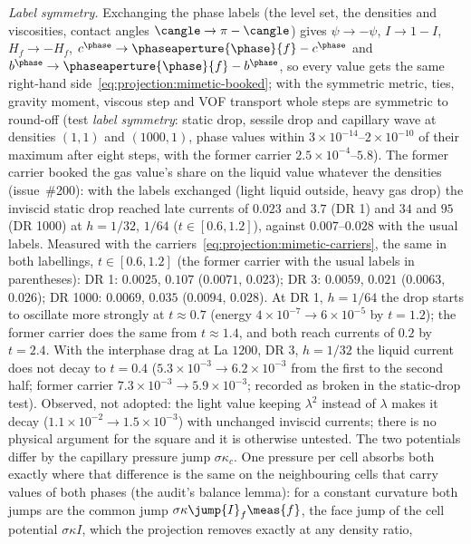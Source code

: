 \emph{Label symmetry.} Exchanging the phase labels (the level set, the
densities and viscosities, contact angles $\cangle\to\pi-\cangle$) gives
$\psi\to-\psi$, $I\to1-I$, $H_f\to-H_f$, $c^{\phase}\to\phaseaperture{\phase}{f}-c^{\phase}$
and $b^{\phase}\to\phaseaperture{\phase}{f}-b^{\phase}$, so every value gets the
same right-hand side~\cref{eq:projection:mimetic-booked}; with the symmetric
metric, ties, gravity moment, viscous step and VOF transport whole steps are
symmetric to round-off (test \emph{label symmetry}: static drop, sessile drop
and capillary wave at densities $(1,1)$ and $(1000,1)$, phase values within
$3\times10^{-14}$--$2\times10^{-10}$ of their maximum after eight steps, with
the former carrier $2.5\times10^{-4}$--$5.8$). The former carrier booked the
gas value's share on the liquid value whatever the densities (issue~\#200):
with the labels exchanged (light liquid outside, heavy gas drop) the inviscid
static drop reached late currents of $0.023$ and $3.7$ (DR 1) and $34$ and
$95$ (DR 1000) at $h=1/32$, $1/64$ ($t\in[0.6,1.2]$), against $0.007$--$0.028$ with the usual labels. Measured
with the carriers~\cref{eq:projection:mimetic-carriers}, the same in both
labellings, $t\in[0.6,1.2]$ (the former carrier with the usual labels in parentheses): DR 1:
$0.0025$, $0.107$ ($0.0071$, $0.023$); DR 3: $0.0059$, $0.021$ ($0.0063$,
$0.026$); DR 1000: $0.0069$, $0.035$ ($0.0094$, $0.028$). At DR 1, $h=1/64$
the drop starts to oscillate more strongly at $t\approx0.7$ (energy
$4\times10^{-7}\to6\times10^{-5}$ by $t=1.2$); the former carrier does the same
from $t\approx1.4$, and both reach currents of $0.2$ by $t=2.4$. With the
interphase drag at La $1200$, DR 3, $h=1/32$ the liquid current does not
decay to $t=0.4$ ($5.3\times10^{-3}\to6.2\times10^{-3}$ from the first to the
second half; former carrier $7.3\times10^{-3}\to5.9\times10^{-3}$; recorded as
broken in the static-drop test). Observed, not adopted: the light value
keeping $\lambda^2$ instead of $\lambda$ makes it decay
($1.1\times10^{-2}\to1.5\times10^{-3}$) with unchanged inviscid currents; there
is no physical argument for the square and it is otherwise untested.
The two potentials differ by the capillary pressure jump $\sigma\kappa_c$. One
pressure per cell absorbs both exactly where that difference is the same on
the neighbouring cells that carry values of both phases (the audit's balance
lemma): for a constant curvature both jumps are the common jump
$\sigma\kappa\jump{I}_f\meas{f}$, the face jump of the cell potential
$\sigma\kappa I$, which the projection removes exactly at any density ratio,
